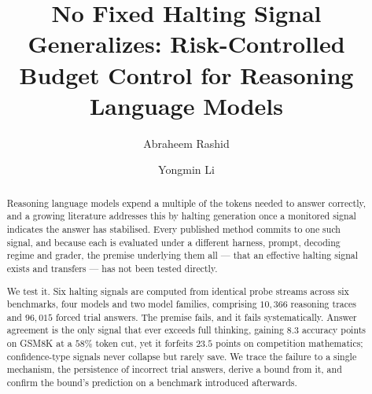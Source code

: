 \documentclass[acmsmall]{acmart}
\theoremstyle{acmdefinition}%
\theoremstyle{acmplain}}{}%
\begin{document}
\title{No Fixed Halting Signal Generalizes: Risk-Controlled Budget Control for Reasoning Language Models}

\author{Abraheem Rashid}

\author{Yongmin Li}

\renewcommand{\shortauthors}{Rashid and Li}

\begin{abstract}
Reasoning language models expend a multiple of the tokens needed to answer correctly, and a growing literature addresses this by halting generation once a monitored signal indicates the answer has stabilised. Every published method commits to one such signal, and because each is evaluated under a different harness, prompt, decoding regime and grader, the premise underlying them all --- that an effective halting signal exists and transfers --- has not been tested directly.

We test it. Six halting signals are computed from identical probe streams across six benchmarks, four models and two model families, comprising $10{,}366$ reasoning traces and $96{,}015$ forced trial answers. The premise fails, and it fails systematically. Answer agreement is the only signal that ever exceeds full thinking, gaining $8.3$ accuracy points on GSM8K at a $58\%$ token cut, yet it forfeits $23.5$ points on competition mathematics; confidence-type signals never collapse but rarely save. We trace the failure to a single mechanism, the persistence of incorrect trial answers, derive a bound from it, and confirm the bound's prediction on a benchmark introduced afterwards.


\end{abstract}
\end{document}
